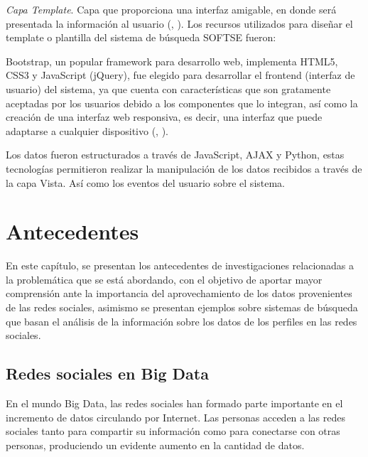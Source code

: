 \textit{Capa Template}.        
Capa que proporciona una interfaz amigable, en donde será presentada la información al usuario (\citeauthor{Django}, \citeyear{Django}). Los recursos utilizados para diseñar el template o plantilla del sistema de búsqueda SOFTSE fueron:

Bootstrap, un popular framework para desarrollo web, implementa HTML5, CSS3 y JavaScript (jQuery), fue elegido para desarrollar el frontend (interfaz de usuario) del sistema, ya que cuenta con características que son gratamente aceptadas por los usuarios debido a los componentes que lo integran, así como la creación de una interfaz web responsiva, es decir, una interfaz que puede adaptarse a cualquier dispositivo (\citeauthor{Bootstrap}, \citeyear{Bootstrap}).

Los datos fueron estructurados a través de JavaScript, AJAX y Python, estas tecnologías permitieron realizar la manipulación de los datos recibidos a través de la capa Vista. Así como los eventos del usuario sobre el sistema.

%
%
%

\chapter{Antecedentes}
\label{chap:ant}

En este capítulo, se presentan los antecedentes de investigaciones relacionadas a la problemática que se está abordando, con el objetivo de aportar mayor comprensión ante la importancia del aprovechamiento de los datos provenientes de las redes sociales, asimismo se presentan ejemplos sobre sistemas de búsqueda que basan el análisis de la información sobre los datos de los perfiles en las redes sociales.

\section{Redes sociales en Big Data}
\label{sec:sec01} 
En el mundo Big Data, las redes sociales han formado parte importante en el incremento de datos circulando por Internet. Las personas acceden a las redes sociales tanto para compartir su información como para conectarse con otras personas, produciendo un evidente aumento en la cantidad de datos. 
%
%
%

